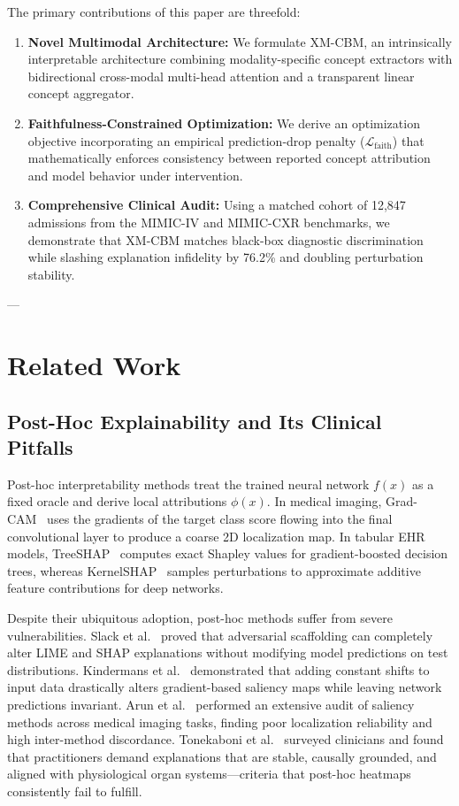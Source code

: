 \documentclass[10pt,journal,compsoc,twocolumn]{IEEEtran}
\begin{document}
The primary contributions of this paper are threefold:
\begin{enumerate}
    \item \textbf{Novel Multimodal Architecture:} We formulate XM-CBM, an intrinsically interpretable architecture combining modality-specific concept extractors with bidirectional cross-modal multi-head attention and a transparent linear concept aggregator.
    \item \textbf{Faithfulness-Constrained Optimization:} We derive an optimization objective incorporating an empirical prediction-drop penalty ($\mathcal{L}_{\text{faith}}$) that mathematically enforces consistency between reported concept attribution and model behavior under intervention.
    \item \textbf{Comprehensive Clinical Audit:} Using a matched cohort of 12,847 admissions from the MIMIC-IV and MIMIC-CXR benchmarks, we demonstrate that XM-CBM matches black-box diagnostic discrimination while slashing explanation infidelity by 76.2\% and doubling perturbation stability.
\end{enumerate}

---

\section{Related Work}

\subsection{Post-Hoc Explainability and Its Clinical Pitfalls}
Post-hoc interpretability methods treat the trained neural network $f(x)$ as a fixed oracle and derive local attributions $\phi(x)$. In medical imaging, Grad-CAM~\cite{selvaraju2017gradcam} uses the gradients of the target class score flowing into the final convolutional layer to produce a coarse 2D localization map. In tabular EHR models, TreeSHAP~\cite{lundberg2017unified} computes exact Shapley values for gradient-boosted decision trees, whereas KernelSHAP~\cite{lundberg2017unified} samples perturbations to approximate additive feature contributions for deep networks. 

Despite their ubiquitous adoption, post-hoc methods suffer from severe vulnerabilities. Slack et al.~\cite{slack2020fooling} proved that adversarial scaffolding can completely alter LIME and SHAP explanations without modifying model predictions on test distributions. Kindermans et al.~\cite{kindermans2019unreliability} demonstrated that adding constant shifts to input data drastically alters gradient-based saliency maps while leaving network predictions invariant. Arun et al.~\cite{arun2021assessing} performed an extensive audit of saliency methods across medical imaging tasks, finding poor localization reliability and high inter-method discordance. Tonekaboni et al.~\cite{tonekaboni2019what} surveyed clinicians and found that practitioners demand explanations that are stable, causally grounded, and aligned with physiological organ systems---criteria that post-hoc heatmaps consistently fail to fulfill.
\end{document}
